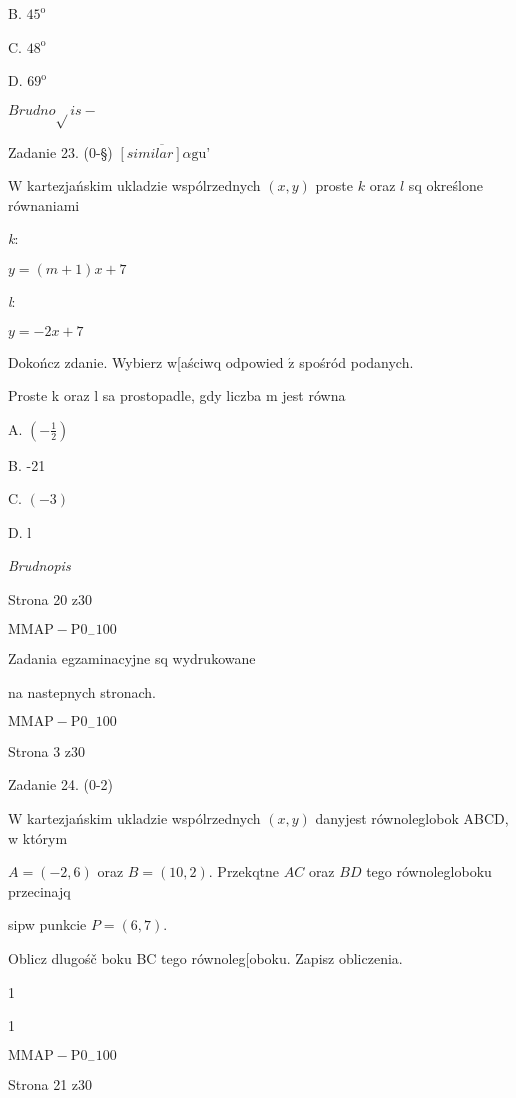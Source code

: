 \documentclass[a4paper,12pt]{article}
\begin{document}
B. $45^{\mathrm{o}}$

C. $48^{\mathrm{o}}$

D. $69^{\mathrm{o}}$

$Brudno\sqrt{}is -$

Zadanie 23. (0-\S) $\overline{[similar]\alpha \mathrm{g}\mathrm{u}}$'

$\mathrm{W}$ kartezjańskim ukladzie wspólrzednych $(x,y)$ proste $k$ oraz $l$ sq określone równaniami

{\it k}:

$y=(m+1)x+7$

{\it l}:

$y=-2x+7$

Dokończ zdanie. Wybierz w[aściwq odpowied $\acute{\mathrm{z}}$ spośród podanych.

Proste k oraz l sa prostopadle, gdy liczba m jest równa

A. $(-\displaystyle \frac{1}{2})$

B. -21

C. $(-3)$

D. l

{\it Brudnopis}

Strona 20 z30

$\mathrm{M}\mathrm{M}\mathrm{A}\mathrm{P}-\mathrm{P}0_{-}100$





Zadania egzaminacyjne sq wydrukowane

na nastepnych stronach.

$\mathrm{M}\mathrm{M}\mathrm{A}\mathrm{P}-\mathrm{P}0_{-}100$

Strona 3 z30





Zadanie 24. (0-2)

$\mathrm{W}$ kartezjańskim ukladzie wspólrzednych $(x,y)$ danyjest równoleglobok ABCD, w którym

$A=(-2,6)$ oraz $B=(10,2)$. Przekqtne $AC$ oraz $BD$ tego równolegloboku przecinajq

sipw punkcie $P=(6,7).$

Oblicz dlugośč boku BC tego równoleg[oboku. Zapisz obliczenia.

1

1

$\mathrm{M}\mathrm{M}\mathrm{A}\mathrm{P}-\mathrm{P}0_{-}100$

Strona 21 z30
\end{document}
